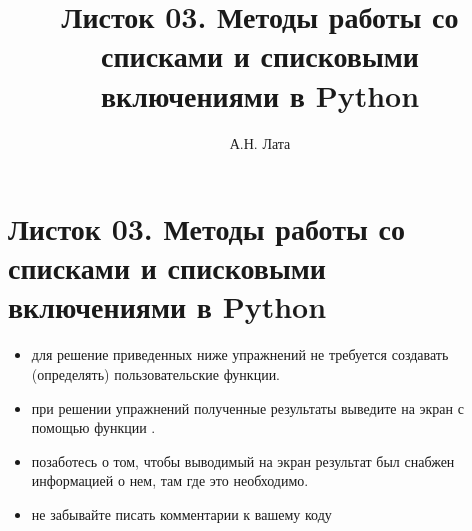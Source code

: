 \documentclass[a4,12pt]{article}
\title{Листок 03. Методы работы со списками и списковыми включениями в Python}
\author{А.Н. Лата}
\theoremstyle{remark}
\begin{document}
 


\section*{\centering Листок 03. Методы работы со списками и списковыми включениями в Python}

\begin{exercisenote}[title=Замечания]
\begin{itemize}
    \item для решение приведенных ниже упражнений не требуется создавать (определять) пользовательские функции.
    \item при решении упражнений полученные результаты выведите на экран с помощью функции {\color{blue}{print()}}.
    \item позаботесь о том, чтобы выводимый на экран результат был снабжен информацией о нем, там где это необходимо.
    \item не забывайте писать комментарии к вашему коду
\end{itemize}
\end{exercisenote}
\end{document}
